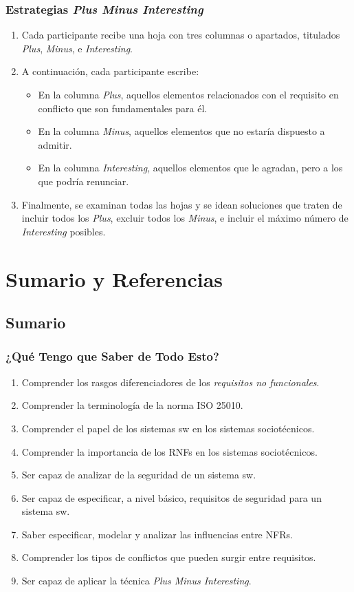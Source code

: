 \documentclass[a4paper,slidestop,xcolor=pst,dvips,blue]{beamer}
\begin{document}
\begin{frame}[c]
	\frametitle{Estrategias \emph{Plus Minus Interesting}}
	\begin{enumerate}[<+->]
		\item Cada participante recibe una hoja con tres columnas o apartados, titulados \emph{Plus}, \emph{Minus}, e \emph{Interesting}.
		\item A continuación, cada participante escribe:
		\begin{itemize}[<+->]
			\item En la columna \emph{Plus}, aquellos elementos relacionados con el requisito en conflicto que son fundamentales para él.
			\item En la columna \emph{Minus}, aquellos elementos que no estaría dispuesto a admitir.		
			\item En la columna \emph{Interesting}, aquellos elementos que le agradan, pero a los que podría renunciar.		 
		\end{itemize}
		\item Finalmente, se examinan todas las hojas y se idean soluciones que traten de incluir todos los \emph{Plus}, excluir todos los \emph{Minus}, e incluir el máximo número de \emph{Interesting} posibles.
	\end{enumerate}
\end{frame}

\section{Sumario y Referencias}

\subsection{Sumario}

\begin{frame}[c]
    \frametitle{¿Qué Tengo que Saber de Todo Esto?}
    \begin{enumerate}[<+->]
        \item Comprender los rasgos diferenciadores de los \emph{requisitos no funcionales}.
        \item Comprender la terminología de la norma ISO 25010.
        \item Comprender el papel de los sistemas sw en los sistemas sociotécnicos.
        \item Comprender la importancia de los RNFs en los sistemas sociotécnicos.
        \item Ser capaz de analizar de la seguridad de un sistema sw.
        \item Ser capaz de especificar, a nivel básico, requisitos de seguridad para un sistema sw. 
        \item Saber especificar, modelar y analizar las influencias entre NFRs.
        \item Comprender los tipos de conflictos que pueden surgir entre requisitos.
        \item Ser capaz de aplicar la técnica \emph{Plus Minus Interesting}.
    \end{enumerate}
\end{frame}
\end{document}
